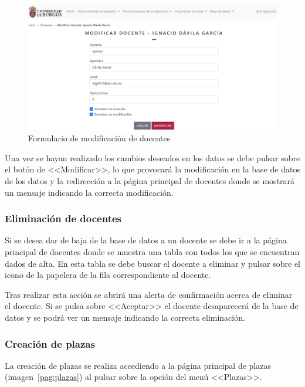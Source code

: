 \begin{figure}
	\centering
	\includegraphics[width=\textwidth]{../img/Anexos/Manual usuario/formModDocente.png}
	\caption{Formulario de modificación de docentes}\label{pag:formModDocente}
\end{figure}

Una vez se hayan realizado los cambios deseados en los datos se debe pulsar sobre el botón de <<Modificar>>, lo que provocará la modificación en la base de datos de los datos y la redirección a la página principal de docentes donde se mostrará un mensaje indicando la correcta modificación.

\subsubsection{Eliminación de docentes}
Si se desea dar de baja de la base de datos a un docente se debe ir a la página principal de docentes donde se muestra una tabla con todos los que se encuentran dados de alta.
En esta tabla se debe buscar el docente a eliminar y pulsar sobre el icono de la papelera de la fila correspondiente al docente.

Tras realizar esta acción se abrirá una alerta de confirmación acerca de eliminar el docente.
Si se pulsa sobre <<Aceptar>> el docente desaparecerá de la base de datos y se podrá ver un mensaje indicando la correcta eliminación.

\subsubsection{Creación de plazas}
La creación de plazas se realiza accediendo a la página principal de plazas (imagen~\ref{pag:plazas}) al pulsar sobre la opción del menú <<Plazas>>.

